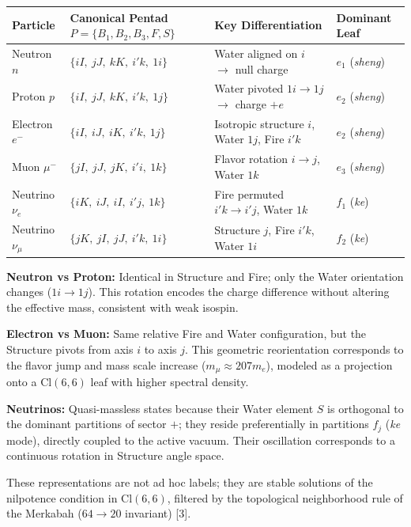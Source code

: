 \documentclass[11pt]{article}
\begin{document}
\begin{table}[H]
\centering
\begin{tabular}{@{}llll@{}}
\toprule
Particle & Canonical Pentad $P = \{B_1, B_2, B_3, F, S\}$ & Key Differentiation & Dominant Leaf \\
\midrule
Neutron $n$ & $\{iI,\ jJ,\ kK,\ i'k,\ 1i\}$ & Water aligned on $i$ $\to$ null charge & $e_1$ (\textit{sheng}) \\
Proton $p$ & $\{iI,\ jJ,\ kK,\ i'k,\ 1j\}$ & Water pivoted $1i \to 1j$ $\to$ charge $+e$ & $e_2$ (\textit{sheng}) \\
Electron $e^-$ & $\{iI,\ iJ,\ iK,\ i'k,\ 1j\}$ & Isotropic structure $i$, Water $1j$, Fire $i'k$ & $e_2$ (\textit{sheng}) \\
\midrule
Muon $\mu^-$ & $\{jI,\ jJ,\ jK,\ i'i,\ 1k\}$ & Flavor rotation $i \to j$, Water $1k$ & $e_3$ (\textit{sheng}) \\
Neutrino $\nu_e$ & $\{iK,\ iJ,\ iI,\ i'j,\ 1k\}$ & Fire permuted $i'k \to i'j$, Water $1k$ & $f_1$ (\textit{ke}) \\
Neutrino $\nu_\mu$ & $\{jK,\ jI,\ jJ,\ i'k,\ 1i\}$ & Structure $j$, Fire $i'k$, Water $1i$ & $f_2$ (\textit{ke}) \\
\bottomrule
\end{tabular}
\end{table}

\textbf{Neutron vs Proton:} Identical in Structure and Fire; only the
Water orientation changes (\(1i \to 1j\)). This rotation encodes the
charge difference without altering the effective mass, consistent with
weak isospin.

\textbf{Electron vs Muon:} Same relative Fire and Water configuration,
but the Structure pivots from axis \(i\) to axis \(j\). This geometric
reorientation corresponds to the flavor jump and mass scale increase
(\(m_\mu \approx 207 m_e\)), modeled as a projection onto a
\(\text{Cl}(6,6)\) leaf with higher spectral density.

\textbf{Neutrinos:} Quasi-massless states because their Water element
\(S\) is orthogonal to the dominant partitions of sector \(+\); they
reside preferentially in partitions \(f_j\) (\textit{ke} mode), directly
coupled to the active vacuum. Their oscillation corresponds to a
continuous rotation in Structure angle space.

These representations are not ad hoc labels; they are stable solutions
of the nilpotence condition in \(\text{Cl}(6,6)\), filtered by the
topological neighborhood rule of the Merkabah (\(64 \to 20\) invariant)
{[}3{]}.
\end{document}
